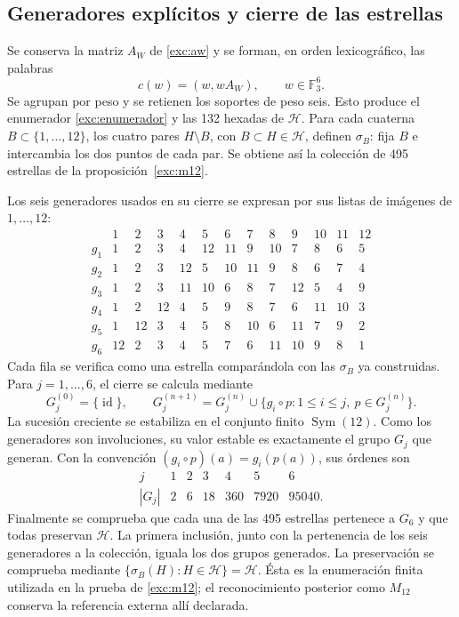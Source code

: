 \subsection{Generadores explícitos y cierre de las estrellas}
\label{iv:apendice-estrellas}

Se conserva la matriz \(A_W\) de \eqref{exc:aw} y se forman,
en orden lexicográfico, las palabras
\[
 c(w)=(w,wA_W),\qquad w\in\mathbb F_3^6.
\]
Se agrupan por peso y se retienen los soportes de peso seis.
Esto produce el enumerador \eqref{exc:enumerador} y las 132 hexadas
de \(\mathcal H\). Para cada cuaterna \(B\subset\{1,\ldots,12\}\),
los cuatro pares \(H\setminus B\), con \(B\subset H\in\mathcal H\),
definen \(\sigma_B\): fija \(B\) e intercambia los dos puntos
de cada par. Se obtiene así la colección de 495 estrellas de
la proposición~\ref{exc:m12}.

Los seis generadores usados en su cierre se expresan por sus listas
de imágenes de \(1,\ldots,12\):
\[
\begin{array}{c|rrrrrrrrrrrr}
 &1&2&3&4&5&6&7&8&9&10&11&12\\ \hline
g_1&1&2&3&4&12&11&9&10&7&8&6&5\\
g_2&1&2&3&12&5&10&11&9&8&6&7&4\\
g_3&1&2&3&11&10&6&8&7&12&5&4&9\\
g_4&1&2&12&4&5&9&8&7&6&11&10&3\\
g_5&1&12&3&4&5&8&10&6&11&7&9&2\\
g_6&12&2&3&4&5&7&6&11&10&9&8&1
\end{array}
\]
Cada fila se verifica como una estrella comparándola con las
\(\sigma_B\) ya construidas. Para \(j=1,\ldots,6\), el cierre
se calcula mediante
\[
 G_j^{(0)}=\{\operatorname{id}\},\qquad
 G_j^{(n+1)}
 =G_j^{(n)}\cup
   \{g_i\circ p:1\leq i\leq j,\ p\in G_j^{(n)}\}.
\]
La sucesión creciente se estabiliza en el conjunto finito
\(\operatorname{Sym}(12)\). Como los generadores son involuciones,
su valor estable es exactamente el grupo \(G_j\) que generan.
Con la convención \((g_i\circ p)(a)=g_i(p(a))\), sus órdenes son
\[
\begin{array}{c|rrrrrr}
 j&1&2&3&4&5&6\\ \hline
 |G_j|&2&6&18&360&7920&95040 .
\end{array}
\]
Finalmente se comprueba que cada una de las 495 estrellas pertenece
a \(G_6\) y que todas preservan \(\mathcal H\). La primera inclusión,
junto con la pertenencia de los seis generadores a la colección,
iguala los dos grupos generados. La preservación se comprueba
mediante \(\{\sigma_B(H):H\in\mathcal H\}=\mathcal H\).
Ésta es la enumeración finita utilizada en la prueba de
\ref{exc:m12}; el reconocimiento posterior como \(M_{12}\)
conserva la referencia externa allí declarada.
